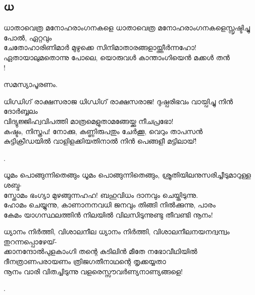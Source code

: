 \subsection{ധ}
\begin{enumerate}

\begin{slokam}{\VSv}{\UN}{ധാതാവെത്ര മനോഹരാംഗനകളെ}
ധാതാവെത്ര മനോഹരാംഗനകളെസ്സൃഷ്ടിച്ചു പോൽ, ഏറ്റവും\\
ചേതോഹാരിണിമാർ മുഴുക്കെ സിനിമാതാരങ്ങളായ്ത്തീർന്നഹോ!\\
ഏതായാലുമതൊന്നു പോലെ, യൊരുവൾ കാന്താംഗിയെൻ മക്കൾ തൻ\\
!
\end{slokam}




സമസ്യാപൂരണം. 



\begin{slokam}{\VSv}{\CUV}{ധിഗ്ധിഗ്‌ രാക്ഷസരാജ}
ധിഗ്ധിഗ്‌ രാക്ഷസരാജ! ദുഷ്പരിഭവം വായ്പിച്ചു നിന്‍ ദോര്‍ബ്ബലം\\
വിദ്യുജ്ജിഹ്വവിപത്തി മാത്രമെളുതാമങ്ങേയ്ക്കു നീചപ്രഭോ!\\
കഷ്ടം, നിസ്ത്രപ! നോക്കു, കണ്ണിരുപതും ചേര്‍ക്കൂ, വെറും താപസന്‍\\
കുട്ടിക്രീഡയില്‍ വാളിളക്കിയതിനാല്‍ നിന്‍ പെങ്ങളീ മട്ടിലായ്‌!
\end{slokam}


.

\begin{slokam}{\VSr}{\CGN}{ധൂമം പൊങ്ങുന്നിതെങ്ങും}
ധൂമം പൊങ്ങുന്നിതെങ്ങും,  ശ്രുതിയിലനുസരിച്ചീടുമാറുള്ള ശബ്ദ- \\ 
സ്തോമം ഭംഗ്യാ മുഴങ്ങുന്നഹഹ! ബഹുവിധം ദാനവും ചെയ്തിടുന്നു. \\
ഹോമം ചെയ്യുന്നു, കാണാനനവധി ജനവും തിങ്ങി നിൽക്കുന്നു, പാരം \\
കേമം യാഗസ്ഥലത്തിൻ നിലയിൽ വിലസിടുന്നുണ്ടു തീവണ്ടി നൂനം! 
\end{slokam}




\begin{slokam}{\VSv}{\VNM}{ധ്യാനം നിർത്തി, വിശാലനീല}
 ധ്യാനം നിർത്തി, വിശാലനീലനയനദ്വന്ദ്വം തുറന്നപ്പൊഴേയ്‌-\\
ക്കാനന്ദോൽപുളകാംഗി തന്റെ കുടിലിൻ മീതേ നഭോവീഥിയിൽ\\
ദീനത്രാണപരായണം ത്രിജഗതീനാഥന്റെ തൃക്കയ്യതാ\\
നൂനം വാരി വിതച്ചിടുന്നു വളരെസ്സൗവർണ്യനാണ്യങ്ങളെ!
\end{slokam}


.


\end{enumerate}

